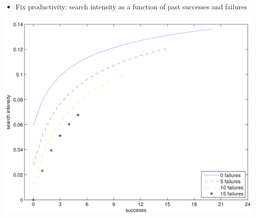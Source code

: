 \documentclass[notes=show]{beamer}
\begin{document}
\begin{frame}%


\begin{itemize}
\item Fix productivity: search intensity as a function of past successes and failures
\end{itemize}

\includegraphics[scale=0.07]{figs/baseline_policy_2d.png}

\end{frame}%
\end{document}

